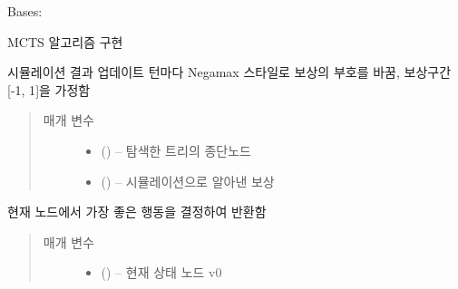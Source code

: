 \documentclass[letterpaper,10pt,english]{sphinxmanual}
\begin{document}
\begin{fulllineitems}
\label{\detokenize{agents.self_learning:agents.self_learning.mcts.MCTSPlanner}}
Bases: 

MCTS 알고리즘 구현

\begin{fulllineitems}
\label{\detokenize{agents.self_learning:agents.self_learning.mcts.MCTSPlanner.backup}}
시뮬레이션 결과 업데이트
턴마다 Negamax 스타일로 보상의 부호를 바꿈,
보상구간 {[}-1, 1{]}을 가정함
\begin{quote}\begin{description}
\item[{매개 변수}] \leavevmode\begin{itemize}
\item {} 
 ({\hyperref[\detokenize{agents.self_learning:agents.self_learning.mcts.Node}]{}}) -- 탐색한 트리의 종단노드

\item {} 
 () -- 시뮬레이션으로 알아낸 보상

\end{itemize}

\end{description}\end{quote}

\end{fulllineitems}


\begin{fulllineitems}
\label{\detokenize{agents.self_learning:agents.self_learning.mcts.MCTSPlanner.best_action}}
현재 노드에서 가장 좋은 행동을 결정하여 반환함
\begin{quote}\begin{description}
\item[{매개 변수}] \leavevmode\begin{itemize}
\item {} 
 ({\hyperref[\detokenize{agents.self_learning:agents.self_learning.mcts.Node}]{}}) -- 현재 상태 노드 v0


\end{itemize}
\end{description}
\end{quote}
\end{fulllineitems}
\end{fulllineitems}
\end{document}
